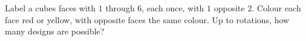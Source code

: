 Label a cube\textquotesingle s faces with $1$ through $6$, each once, with $1$ opposite $2$. Colour each face red or yellow, with opposite faces the same colour. Up to rotations, how many designs are possible?
